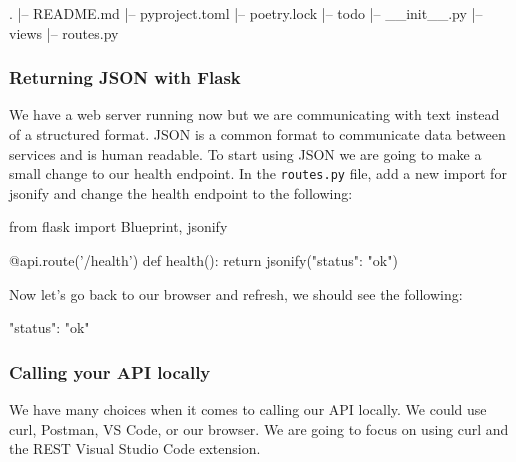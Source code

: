 \documentclass{csse4400}
\begin{document}
\noindent\begin{minipage}{\textwidth}
\begin{code}[language=bash,numbers=none]{}
  .
  |-- README.md
  |-- pyproject.toml
  |-- poetry.lock
  |-- todo
      |-- __init__.py
      |-- views
          |-- routes.py
\end{code}
\end{minipage}

\subsubsection{Returning JSON with Flask}

We have a web server running now but we are communicating with text instead of a structured format. JSON is a common format to communicate data between services and is human readable. To start using JSON we are going to make a small change to our health endpoint. In the \texttt{routes.py} file, add a new import for jsonify and change the health endpoint to the following:

\begin{code}[language=python]{}
  from flask import Blueprint, jsonify
\end{code}

\begin{code}[language=python,firstnumber=6]{}
  @api.route('/health')
  def health():
      return jsonify({"status": "ok"})
\end{code}

Now let's go back to our browser and refresh, we should see the following:

\begin{code}[language=json,numbers=none]{}
  {
    "status": "ok"
  }
\end{code}


\subsubsection{Calling your API locally}

We have many choices when it comes to calling our API locally.
We could use curl, Postman, VS Code, or our browser.
We are going to focus on using curl and the REST Visual Studio Code extension.

\end{document}
